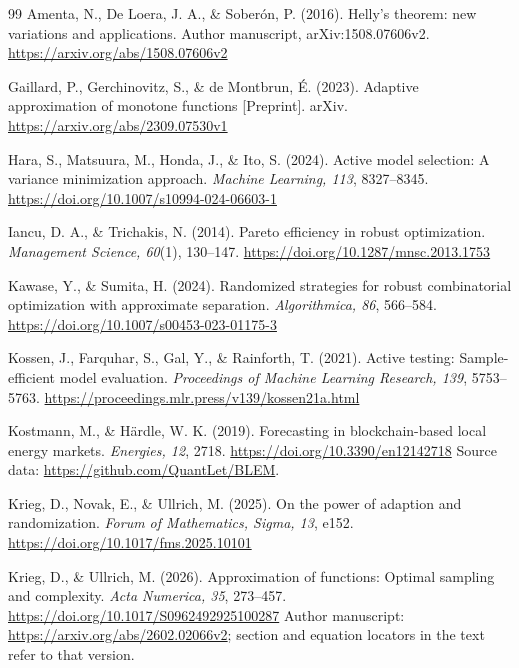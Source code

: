 \documentclass[12pt]{article}
\begin{document}
\FloatBarrier
\begin{thebibliography}{99}
Amenta, N., De Loera, J. A., \& Sober\'on, P. (2016). Helly's theorem: new variations
and applications. Author manuscript, arXiv:1508.07606v2.
\url{https://arxiv.org/abs/1508.07606v2}

Gaillard, P., Gerchinovitz, S., \& de Montbrun, {\'E}. (2023).
Adaptive approximation of monotone functions [Preprint].
arXiv. \url{https://arxiv.org/abs/2309.07530v1}

Hara, S., Matsuura, M., Honda, J., \& Ito, S. (2024).
Active model selection: A variance minimization approach.
\emph{Machine Learning, 113}, 8327--8345.
\url{https://doi.org/10.1007/s10994-024-06603-1}

Iancu, D. A., \& Trichakis, N. (2014). Pareto efficiency in robust optimization.
\emph{Management Science, 60}(1), 130--147.
\url{https://doi.org/10.1287/mnsc.2013.1753}

Kawase, Y., \& Sumita, H. (2024). Randomized strategies for robust
combinatorial optimization with approximate separation.
\emph{Algorithmica, 86}, 566--584.
\url{https://doi.org/10.1007/s00453-023-01175-3}

Kossen, J., Farquhar, S., Gal, Y., \& Rainforth, T. (2021).
Active testing: Sample-efficient model evaluation.
\emph{Proceedings of Machine Learning Research, 139}, 5753--5763.
\url{https://proceedings.mlr.press/v139/kossen21a.html}

Kostmann, M., \& H\"ardle, W. K. (2019). Forecasting in blockchain-based
local energy markets. \emph{Energies, 12}, 2718.
\url{https://doi.org/10.3390/en12142718}
Source data: \url{https://github.com/QuantLet/BLEM}.

Krieg, D., Novak, E., \& Ullrich, M. (2025).
On the power of adaption and randomization.
\emph{Forum of Mathematics, Sigma, 13}, e152.
\url{https://doi.org/10.1017/fms.2025.10101}

Krieg, D., \& Ullrich, M. (2026).
Approximation of functions: Optimal sampling and complexity.
\emph{Acta Numerica, 35}, 273--457.
\url{https://doi.org/10.1017/S0962492925100287}
Author manuscript: \url{https://arxiv.org/abs/2602.02066v2};
section and equation locators in the text refer to that version.


\end{thebibliography}
\end{document}
